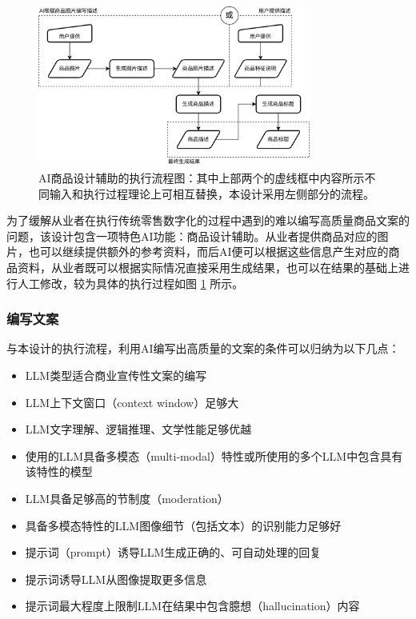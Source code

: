 \begin{figure}[htbp]
	\centering
	\includegraphics[width=0.8\textwidth]{./imgs/ai-writeup.png}
	\caption{AI商品设计辅助的执行流程图：其中上部两个的虚线框中内容所示不同输入和执行过程理论上可相互替换，本设计采用左侧部分的流程。}
	\label{fig:ai-writeup}
\end{figure}

为了缓解从业者在执行传统零售数字化的过程中遇到的难以编写高质量商品文案的问题，该设计包含一项特色AI功能：商品设计辅助。从业者提供商品对应的图片，也可以继续提供额外的参考资料，而后AI便可以根据这些信息产生对应的商品资料，从业者既可以根据实际情况直接采用生成结果，也可以在结果的基础上进行人工修改，较为具体的执行过程如图 \ref{fig:ai-writeup} 所示。

\subsubsection{编写文案}

与本设计的执行流程，利用AI编写出高质量的文案的条件可以归纳为以下几点：

\begin{itemize}
    \item LLM类型适合商业宣传性文案的编写
    \item LLM上下文窗口（context window）足够大
    \item LLM文字理解、逻辑推理、文学性能足够优越
    \item 使用的LLM具备多模态（multi-modal）特性或所使用的多个LLM中包含具有该特性的模型
    \item LLM具备足够高的节制度（moderation）
    \item 具备多模态特性的LLM图像细节（包括文本）的识别能力足够好
    \item 提示词（prompt）诱导LLM生成正确的、可自动处理的回复
    \item 提示词诱导LLM从图像提取更多信息
    \item 提示词最大程度上限制LLM在结果中包含臆想（hallucination）内容
\end{itemize}

